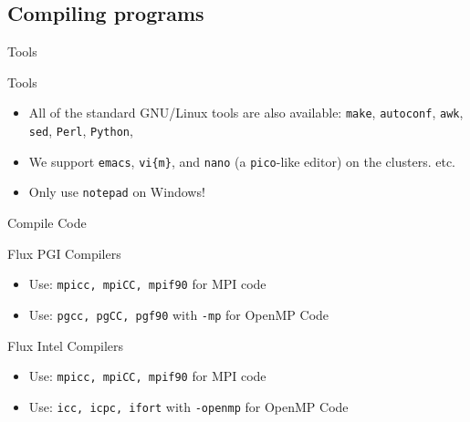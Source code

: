 \documentclass[handout]{beamer}
\begin{document}
  \subsection{Compiling programs}
  \begin{frame}{Tools}
   \begin{block}{Tools}
    \begin{itemize}
    \item<1- > All of the standard GNU/Linux tools are also available: \texttt{make},
      \texttt{autoconf}, \texttt{awk}, \texttt{sed}, \texttt{Perl}, \texttt{Python},
    \item<2- > We support \texttt{emacs}, \texttt{vi\{m\}}, and \texttt{nano} (a 
      \texttt{pico}-like editor) on the clusters.
      etc.
    \item<3-| alert@1-> Only use \texttt{notepad} on Windows!
    \end{itemize}
   \end{block}
  \end{frame}
  \begin{frame}{Compile Code}
   \begin{block}{Flux PGI Compilers}
   \begin{itemize}
    \item Use: \texttt{mpicc, mpiCC, mpif90} for MPI code
    \item Use: \texttt{pgcc, pgCC, pgf90} with \texttt{-mp} for OpenMP Code
   \end{itemize}
   \end{block}
   \begin{block}{Flux Intel Compilers}
    \begin{itemize}
     \item Use: \texttt{mpicc, mpiCC, mpif90} for MPI code
     \item Use: \texttt{icc, icpc, ifort} with \texttt{-openmp} for OpenMP Code
    \end{itemize}
   \end{block}
  \end{frame}
\end{document}
